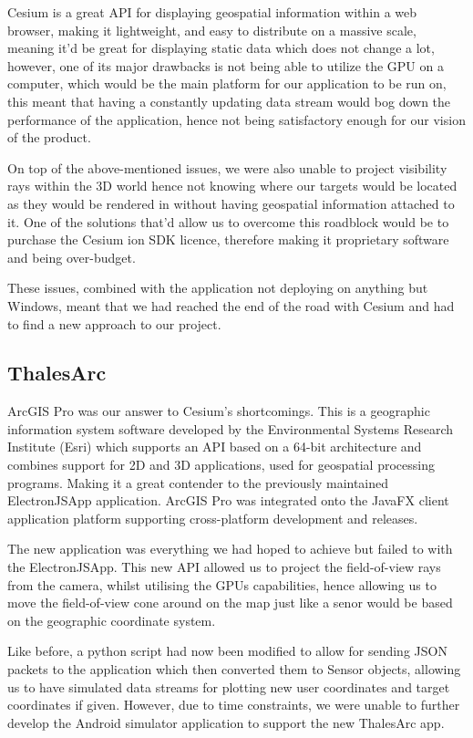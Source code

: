 \documentclass{l3proj}
\begin{document}
Cesium is a great API for displaying geospatial information within a web browser, making it lightweight, and easy to distribute on a massive scale, meaning it'd be great for displaying static data which does not change a lot, however, one of its major drawbacks is not being able to utilize the GPU on a computer, which would be the main platform for our application to be run on, this meant that having a constantly updating data stream would bog down the performance of the application, hence not being satisfactory enough for our vision of the product.

On top of the above-mentioned issues, we were also unable to project visibility rays within the 3D world hence not knowing where our targets would be located as they would be rendered in without having geospatial information attached to it. One of the solutions that'd allow us to overcome this roadblock would be to purchase the Cesium ion SDK licence, therefore making it proprietary software and being over-budget.

These issues, combined with the application not deploying on anything but Windows, meant that we had reached the end of the road with Cesium and had to find a new approach to our project.

\subsection{ThalesArc}

ArcGIS Pro was our answer to Cesium’s shortcomings. This is a geographic information system software developed by the Environmental Systems Research Institute (Esri) which supports an API based on a 64-bit architecture and combines support for 2D and 3D applications, used for geospatial processing programs. Making it a great contender to the previously maintained ElectronJSApp application. ArcGIS Pro was integrated onto the JavaFX client application platform supporting cross-platform development and releases.

The new application was everything we had hoped to achieve but failed to with the ElectronJSApp. This new API allowed us to project the field-of-view rays from the camera, whilst utilising the GPUs capabilities, hence allowing us to move the field-of-view cone around on the map just like a senor would be based on the geographic coordinate system.

Like before, a python script had now been modified to allow for sending JSON packets to the application which then converted them to Sensor objects, allowing us to have simulated data streams for plotting new user coordinates and target coordinates if given. However, due to time constraints, we were unable to further develop the Android simulator application to support the new ThalesArc app.
\end{document}
